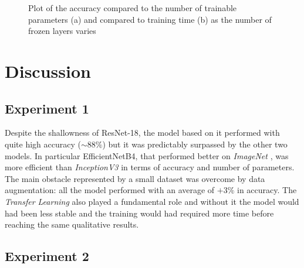 \begin{figure}
    \centering
    \caption{Plot of the accuracy compared to the number of trainable parameters (a) and compared to training time (b) as the number of frozen layers varies}
    \label{fig:time_acc}
\end{figure}




\section{Discussion}
\subsection{Experiment 1}
Despite the shallowness of ResNet-18, the model based on it performed with quite high accuracy ($\sim 88\%$) but it was predictably surpassed by the other two models. In particular EfficientNetB4, that performed better on \textit{ImageNet} \cite{tan2019efficientnet}, was more efficient than \textit{InceptionV3} in terms of accuracy and number of parameters. The main obstacle represented by a small dataset was overcome by data augmentation: all the model performed with an average of $+3\%$ in accuracy. The \textit{Transfer Learning} also played a fundamental role and  without it the model would had been less stable and the training would had required more time before reaching the same qualitative results.

\subsection{Experiment 2}


